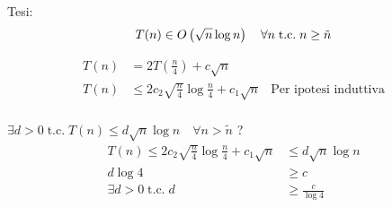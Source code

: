 \begin{enumerate}[label=\alph*)]
	Tesi:\\
	\[
		T(n) \in O\left(\sqrt{n} \log n\right)\quad \forall n \;\text{t.c.}\; n \geq \tilde{n}
	\]
	
	\begin{align*}
		T(n) &= 2T \left( \frac{n}{4} \right) + c\sqrt{n}  \\
		T(n) &\leq 2c_2\sqrt{\frac{n}{4}} \log \frac{n}{4} + c_1\sqrt{n}  & \text{Per ipotesi induttiva} \\
	\end{align*}
	
	\( \exists d>0 \;\text{t.c.}\; T(n) \leq d \sqrt{n} \log n \quad \forall n > \tilde{n} \) ? \\
	
	\begin{align*}
		T(n) \leq 2c_2\sqrt{\frac{n}{4}} \log \frac{n}{4} + c_1\sqrt{n} &\leq d \sqrt{n} \log n \\
		d \log 4 &\geq c \\
		\exists d > 0 \;\text{t.c.}\; d &\geq \frac{c}{\log 4} \\
	\end{align*}

\end{enumerate}
